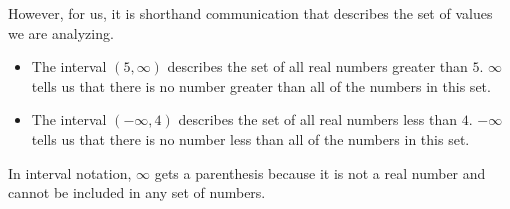 \documentclass{ximera}
\begin{document}
However, for us, it is shorthand communication that describes the set of values we are analyzing.







\begin{example}


\begin{itemize}
\item The interval $(5, \infty)$ describes the set of all real numbers greater than $5$.  $\infty$ tells us that there is no number greater than all of the numbers in this set.



\item The interval $(-\infty, 4)$ describes the set of all real numbers less than $4$.  $-\infty$ tells us that there is no number less than all of the numbers in this set.
\end{itemize}




\end{example}
In interval notation, $\infty$ gets a parenthesis because it is not a real number and cannot be included in any set of numbers.
\end{document}
